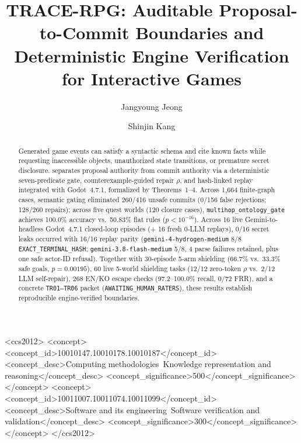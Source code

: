 \documentclass[sigconf,anonymous,review]{acmart}
\begin{document}
\title{TRACE-RPG: Auditable Proposal-to-Commit Boundaries and Deterministic Engine Verification for Interactive Games}

\author{Jangyoung Jeong}
\author{Shinjin Kang}

\begin{abstract}
Generated game events can satisfy a syntactic schema and cite known facts while requesting inaccessible objects, unauthorized state transitions, or premature secret disclosure. \system{} separates proposal authority from commit authority via a deterministic seven-predicate gate, counterexample-guided repair $\rho$, and hash-linked replay integrated with Godot~4.7.1, formalized by Theorems~1--4. Across 1,664 finite-graph cases, semantic gating eliminated 260/416 unsafe commits (0/156 false rejections; 128/260 repairs); across five quest worlds (120 closure cases), \texttt{multihop\_}\allowbreak\texttt{ontology\_}\allowbreak\texttt{gate} achieves 100.0\% accuracy vs.\ 50.83\% flat rules ($p{<}10^{-16}$). Across 16 live Gemini-to-headless Godot~4.7.1 closed-loop episodes (+ 16 fresh 0-LLM replays), 0/16 secret leaks occurred with 16/16 replay parity (\texttt{gemini-4-}\allowbreak\texttt{hydrogen-\allowbreak medium} 8/8 \texttt{EXACT\_}\allowbreak\texttt{TERMINAL\_}\allowbreak\texttt{HASH}; \texttt{gemini-3.8-}\allowbreak\texttt{flash-\allowbreak medium} 5/8, 4 parse failures retained, plus one safe actor-ID refusal). Together with 30-episode 5-arm shielding (66.7\% vs.\ 33.3\% safe goals, $p{=}0.00195$), 60 live 5-world shielding tasks (12/12 zero-token $\rho$ vs.\ 2/12 LLM self-repair), 268 EN/KO escape checks (97.2--100.0\% recall, 0/72 FRR), and a concrete \texttt{TR01--TR06} packet (\texttt{AWAITING\_}\allowbreak\texttt{HUMAN\_}\allowbreak\texttt{RATERS}), these results establish reproducible engine-verified boundaries.
\end{abstract}

\begin{CCSXML}
<ccs2012>
   <concept>
       <concept_id>10010147.10010178.10010187</concept_id>
       <concept_desc>Computing methodologies~Knowledge representation and reasoning</concept_desc>
       <concept_significance>500</concept_significance>
   </concept>
   <concept>
       <concept_id>10011007.10011074.10011099</concept_id>
       <concept_desc>Software and its engineering~Software verification and validation</concept_desc>
       <concept_significance>300</concept_significance>
   </concept>
</ccs2012>
\end{CCSXML}
\end{document}
